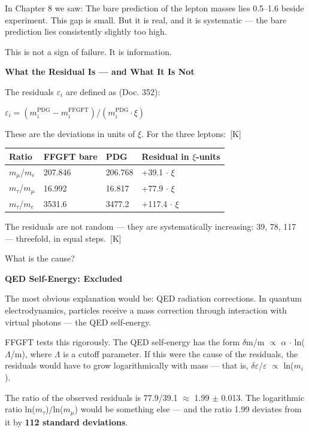 \documentclass[11pt,oneside]{book}
\newcommand{\status}[1]{\penalty10000\,{\scriptsize\textcolor{gray!60}{[#1]}}}
\begin{document}
In Chapter 8 we saw: The bare prediction of the lepton masses lies 0.5–1.6%
beside experiment. This gap is small. But it is real, and it is systematic —
the bare prediction lies consistently slightly too high.

This is not a sign of failure. It is information.

\textbf{What the Residual Is — and What It Is Not}

The residuals $\varepsilon_i$ are defined as (Doc. 352):

$\varepsilon_i = (m_i^\text{PDG} - m_i^\text{FFGFT}) / (m_i^\text{PDG} \cdot \xi)$

These are the deviations in units of $\xi$. For the three leptons: \status{K}

\begin{center}
\small
\begin{tabular}{lp{1.8cm}p{1.5cm}p{2.8cm}}
\toprule
Ratio & FFGFT bare & PDG & Residual in $\xi$-units \\
\midrule
$m_\mu$/$m_e$ & 207.846 & 206.768 & +39.1 $\cdot$ $\xi$ \\
$m_\tau$/$m_\mu$ & 16.992 & 16.817 & +77.9 $\cdot$ $\xi$ \\
$m_\tau$/$m_e$ & 3531.6 & 3477.2 & +117.4 $\cdot$ $\xi$ \\
\bottomrule
\end{tabular}
\end{center}

The residuals are not random — they are systematically increasing: 39, 78, 117
— threefold, in equal steps. \status{K}

What is the cause?

\textbf{QED Self-Energy: Excluded}

The most obvious explanation would be: QED radiation corrections. In quantum
electrodynamics, particles receive a mass correction through interaction
with virtual photons — the QED self-energy.

FFGFT tests this rigorously. The QED self-energy has the form
$\delta$m/m $\propto$ $\alpha$ $\cdot$ ln($\Lambda$/m), where $\Lambda$ is a cutoff parameter. If this
were the cause of the residuals, the residuals would have to grow
logarithmically with mass — that is, $\delta\varepsilon$/$\varepsilon$ $\propto$ ln($m_i$).

The ratio of the observed residuals is 77.9/39.1 $\approx$ 1.99 $\pm$ 0.013.
The logarithmic ratio ln($m_\tau$)/ln($m_\mu$) would be something else —
and the ratio 1.99 deviates from it by \textbf{112 standard deviations}.
\end{document}
